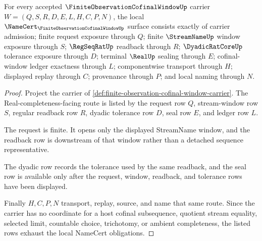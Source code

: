 \begin{theorem}
\label{thm:finite-observation-cofinal-window-namecert-obligations}
For every accepted $\FiniteObservationCofinalWindowUp$ carrier $W=(Q,S,R,D,E,L,H,C,P,N)$, the local $\NameCert_{\FiniteObservationCofinalWindowUp}$ surface consists exactly of carrier admission; finite request exposure through $Q$; finite $\StreamNameUp$ window exposure through $S$; $\RegSeqRatUp$ readback through $R$; $\DyadicRatCoreUp$ tolerance exposure through $D$; terminal $\RealUp$ sealing through $E$; cofinal-window ledger exactness through $L$; componentwise transport through $H$; displayed replay through $C$; provenance through $P$; and local naming through $N$.
\end{theorem}
\begin{proof}
Project the carrier of \autoref{def:finite-observation-cofinal-window-carrier}. The Real-completeness-facing route is listed by the request row $Q$, stream-window row $S$, regular readback row $R$, dyadic tolerance row $D$, seal row $E$, and ledger row $L$.

The request is finite. It opens only the displayed StreamName window, and the readback row is downstream of that window rather than a detached sequence representative.

The dyadic row records the tolerance used by the same readback, and the seal row is available only after the request, window, readback, and tolerance rows have been displayed.

Finally $H,C,P,N$ transport, replay, source, and name that same route. Since the carrier has no coordinate for a host cofinal subsequence, quotient stream equality, selected limit, countable choice, trichotomy, or ambient completeness, the listed rows exhaust the local NameCert obligations.
\end{proof}

